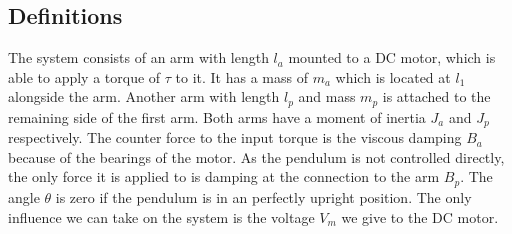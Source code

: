 \subsection{Definitions}
The system consists of an arm with length $l_a$ mounted to a DC motor, which is 
able to apply a torque of $\tau$ to it. It has a mass of $m_a$ which is 
located at $l_1$ alongside the arm. Another arm with length $l_p$ and mass 
$m_p$ %
is attached to the remaining side of the 
first arm. Both arms have a moment of inertia $J_a$ and $J_p$ respectively. The 
counter force to the input torque is the viscous damping $B_a$ because of the 
bearings of the motor. As the pendulum is not controlled directly, the only 
force it is applied to is damping at the connection to the arm $B_p$. The angle 
$\theta$ is zero if the pendulum is in an perfectly upright position.
The only influence we can take on the system is the voltage $V_m$ we give to 
the DC motor.
